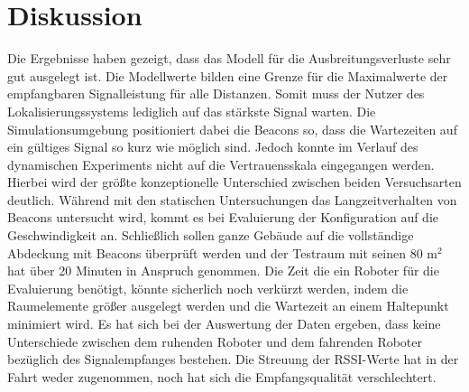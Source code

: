 \section{Diskussion}
Die Ergebnisse haben gezeigt, dass das Modell für die Ausbreitungsverluste sehr gut ausgelegt ist. Die Modellwerte bilden eine Grenze für die Maximalwerte der empfangbaren Signalleistung für alle Distanzen. Somit muss der Nutzer des Lokalisierungssystems lediglich auf das stärkste Signal warten. Die Simulationsumgebung positioniert dabei die Beacons so, dass die Wartezeiten auf ein gültiges Signal so kurz wie möglich sind. Jedoch konnte im Verlauf des dynamischen Experiments nicht auf die Vertrauensskala eingegangen werden. Hierbei wird der größte konzeptionelle Unterschied zwischen beiden Versuchsarten deutlich. Während mit den statischen Untersuchungen das Langzeitverhalten von Beacons untersucht wird, kommt es bei Evaluierung der Konfiguration auf die Geschwindigkeit an. Schließlich sollen ganze Gebäude auf die vollständige Abdeckung mit Beacons überprüft werden und der Testraum mit seinen 80 m$^2$ hat über 20 Minuten in Anspruch genommen. Die Zeit die ein Roboter für die Evaluierung benötigt, könnte sicherlich noch verkürzt werden, indem die Raumelemente größer ausgelegt werden und die Wartezeit an einem Haltepunkt minimiert wird. Es hat sich bei der Auswertung der Daten ergeben, dass keine Unterschiede zwischen dem ruhenden Roboter und dem fahrenden Roboter bezüglich des Signalempfanges bestehen. Die Streuung der RSSI-Werte hat in der Fahrt weder zugenommen, noch hat sich die Empfangsqualität verschlechtert. 
